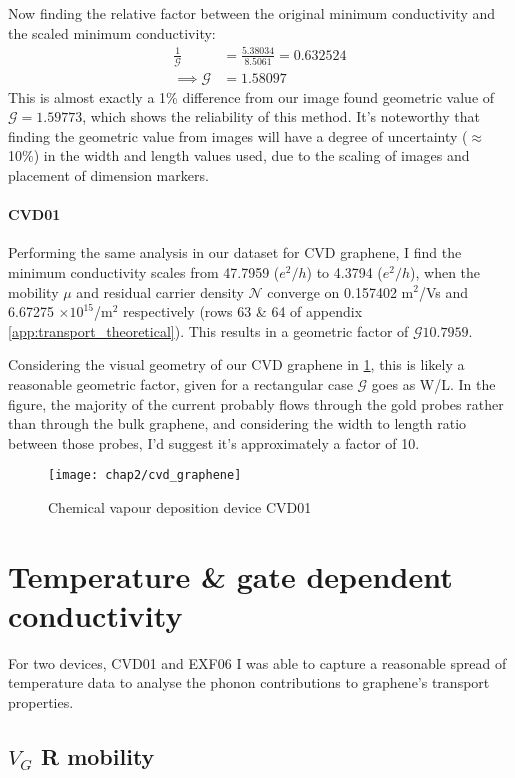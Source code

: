 \documentclass[../Matt_Gebert_Honours_Thesis.tex]{subfiles}
\begin{document}
	Now finding the relative factor between the original minimum conductivity and the scaled minimum conductivity:
	\begin{align}
		\frac{1}{\mathcal{G}} &= \frac{5.38034}{8.5061} = 0.632524\\
		\implies \mathcal{G} &= 1.58097
	\end{align}
	This is almost exactly a 1\% difference from our image found geometric value of $\mathcal{G} = 1.59773$, which shows the reliability of this method. 
	It's noteworthy that finding the geometric value from images will have a degree of uncertainty ($\approx$10\%) in the width and length values used, due to the scaling of images and placement of dimension markers.

	\paragraph{CVD01}
	Performing the same analysis in our dataset for CVD graphene, I find the minimum conductivity scales from 47.7959 ($e^2/h$) to 4.3794 ($e^2/h$), when the mobility $\mu$ and residual carrier density $\mathcal{N}$ converge on 0.157402 m$^2$/Vs and 6.67275 $\times10^{15}$/m$^2$ respectively (rows 63 \& 64 of appendix \ref{app:transport_theoretical}). This results in a geometric factor of $\mathcal{G} 10.7959$.

	Considering the visual geometry of our CVD graphene in \cref{fig:cvd_sample}, this is likely a reasonable geometric factor, given for a rectangular case $\mathcal{G}$ goes as W/L. In the figure, the majority of the current probably flows through the gold probes rather than through the bulk graphene, and considering the width to length ratio between those probes, I'd suggest it's approximately a factor of 10.
	\begin{figure}[H]
		\centering
		\texttt{[image: chap2/cvd\_graphene]}
		\caption[Device CVD01]{Chemical vapour deposition device CVD01}\label{fig:cvd_sample}
	\end{figure}

\section{Temperature \& gate dependent conductivity}
For two devices, CVD01 and EXF06 I was able to capture a reasonable spread of temperature data to analyse the phonon contributions to graphene's transport properties. 

\subsection{$V_G$ R mobility}
\end{document}
